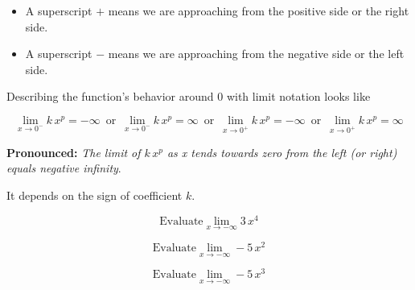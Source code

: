 \documentclass{ximera}
\begin{document}
\begin{itemize}
\item A superscript $+$ means we are approaching from the positive side or the right side.
\item A superscript $-$ means we are approaching from the negative side or the left side.
\end{itemize}


Describing the function's behavior around $0$ with limit notation looks like




\[    \lim_{x \to 0^-} k \, x^p =  -\infty  \,   \text{ or }  \,     \lim_{x \to 0^-} k \, x^p = \infty   \,   \text{ or }  \,      \lim_{x \to 0^+} k \, x^p =  -\infty  \,   \text{ or }  \,     \lim_{x \to 0^+} k \, x^p = \infty   \]




\textbf{\textcolor{blue!55!black}{Pronounced:}} \textit{The limit of $k \, x^p$ as x tends towards zero from the left (or right) equals negative infinity}.

It depends on the sign of coefficient $k$.









\begin{question}

\[ \text{Evaluate} \lim_{x \to -\infty} 3 \, x^4 \]

\begin{multipleChoice}
\choice {$-\infty$}
\choice [correct]{$\infty$}
\end{multipleChoice}
\end{question}






\begin{question}

\[ \text{Evaluate} \lim_{x \to -\infty} -5 \, x^2 \]

\begin{multipleChoice}
\choice [correct]{$-\infty$}
\choice {$\infty$}
\end{multipleChoice}
\end{question}





\begin{question}

\[ \text{Evaluate} \lim_{x \to -\infty} -5 \, x^3 \]

\begin{multipleChoice}
\choice {$-\infty$}
\choice [correct]{$\infty$}
\end{multipleChoice}
\end{question}
\end{document}
